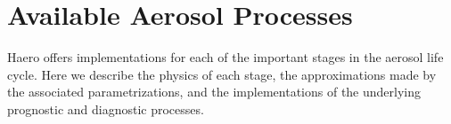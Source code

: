 \chapter{Available Aerosol Processes}

Haero offers implementations for each of the important stages in the aerosol
life cycle. Here we describe the physics of each stage, the approximations
made by the associated parametrizations, and the implementations of the
underlying prognostic and diagnostic processes.


